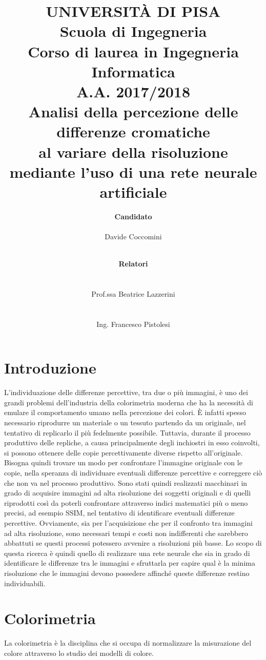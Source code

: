 \documentclass[a4paper,11pt]{article}
\author{
        \rule{0in}{0pt}\textbf{\Large Candidato} \\
        \rule{0in}{0pt}Davide Coccomini \\
        \and
        \rule{1.2in}{0pt}\textbf{\Large Relatori}\\
        \rule{1.2in}{0pt}Prof.ssa Beatrice Lazzerini\\
        \rule{1.2in}{0pt}Ing. Francesco Pistolesi \\
    }
\title{\textbf{UNIVERSITÀ DI PISA} \\[0.4in]
    Scuola di Ingegneria \\
    Corso di laurea in Ingegneria Informatica \\
    A.A. 2017/2018\\[0.7in]
    Analisi della percezione delle differenze cromatiche\\
    al variare della risoluzione mediante l'uso di una rete neurale artificiale\\[0.8in]}
\date{}
\begin{document}
    \pagestyle{fancy}
    \fancyhf{}
    \fancyhead[L]{\rightmark}
    
    \fancyfoot{}
    \fancyfoot[LE,RO]{\thepage}    
    \renewcommand{\footrulewidth}{0.4pt}
    \maketitle
    \newpage
        \tableofcontents
        \newpage
        \section{Introduzione}
        L'individuazione delle differenze percettive, tra due o più immagini, è uno dei grandi problemi dell'industria della colorimetria moderna che ha la necessità di emulare il 
        comportamento umano nella percezione dei colori. È infatti spesso necessario riprodurre un materiale o un tessuto partendo da un originale, nel tentativo di replicarlo il più fedelmente possibile. 
        Tuttavia, durante il processo produttivo delle repliche, a causa principalmente degli inchiostri in esso coinvolti, si possono ottenere delle copie percettivamente diverse rispetto all'originale.
        Bisogna quindi trovare un modo per confrontare l'immagine originale con le copie, nella speranza di individuare eventuali differenze percettive e correggere ciò che non va nel processo produttivo. 
        Sono stati quindi realizzati macchinari in grado di acquisire immagini ad alta risoluzione dei soggetti originali e di quelli riprodotti così da poterli confrontare attraverso indici matematici più o meno precisi, ad esempio SSIM,
        nel tentativo di identificare eventuali differenze percettive. Ovviamente, sia per l'acquisizione che per il confronto tra immagini ad alta risoluzione, sono necessari tempi e costi non indifferenti che sarebbero abbattuti se questi processi potessero avvenire a risoluzioni più basse.
        Lo scopo di questa ricerca è quindi quello di realizzare una rete neurale che sia in grado di identificare le differenze tra le immagini e sfruttarla per capire qual è la minima risoluzione che le immagini devono possedere affinché queste differenze restino individuabili.
    
        \newpage
        \section{Colorimetria}
        La colorimetria è la disciplina che si occupa di normalizzare la misurazione del colore attraverso lo studio dei modelli di colore.
\end{document}

